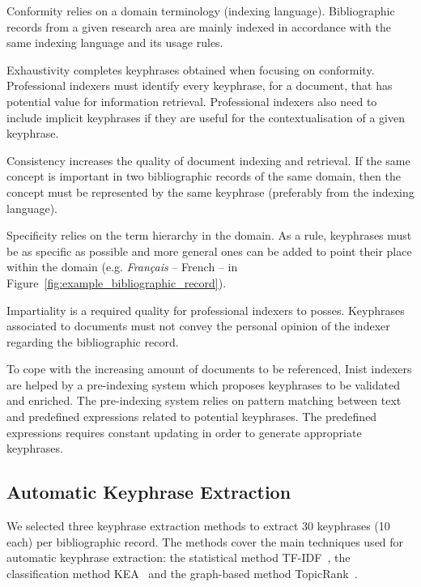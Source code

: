         Conformity relies on a domain terminology (indexing language).
        Bibliographic records from a given research area are mainly indexed in accordance with the same indexing language and its usage rules.

        Exhaustivity completes keyphrases obtained when focusing on conformity.
        Professional indexers must identify every keyphrase, for a document, that has potential value for information retrieval.
        Professional indexers also need to include implicit keyphrases if they are useful for the contextualisation of a given keyphrase.

        Consistency increases the quality of document indexing and retrieval.
        If the same concept is important in two bibliographic records of the same domain, then the concept must be represented by the same keyphrase (preferably from the indexing language).

        Specificity relies on the term hierarchy in the domain.
        As a rule, keyphrases must be as specific as possible and more general ones can be added to point their place within the domain (e.g. \textit{Français} -- French -- in Figure~\ref{fig:example_bibliographic_record}).

        Impartiality is a required quality for professional indexers to posses.
        Keyphrases associated to documents must not convey the personal opinion of the indexer regarding the bibliographic record.
        
        To cope with the increasing amount of documents to be referenced, Inist indexers are helped by a pre-indexing system which proposes keyphrases to be validated and enriched.
        The pre-indexing system relies on pattern matching between text and predefined expressions related to potential keyphrases.
        The predefined expressions requires constant updating in order to generate appropriate keyphrases.

    \subsection{Automatic Keyphrase Extraction}
    \label{subsec:automatic_keyphrase_extraction}
        We selected three keyphrase extraction methods to extract 30 keyphrases (10 each) per bibliographic record.
        The methods cover the main techniques used for automatic keyphrase extraction: the statistical method TF-IDF~\cite{salton1975tfidf}, the classification method KEA~\cite{witten1999kea} and the graph-based method TopicRank~\cite{bougouin2013topicrank}.
        
